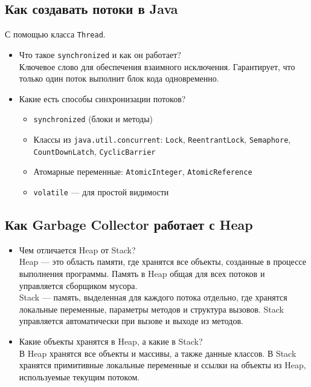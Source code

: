 \documentclass[a4paper,14pt]{article}
\begin{document}
\subsection{Как создавать потоки в Java}
С помощью класса \texttt{Thread}.
\begin{itemize}
\item Что такое \texttt{synchronized} и как он работает? \\
Ключевое слово для обеспечения взаимного исключения. Гарантирует, что только один поток выполнит блок кода одновременно.

\item Какие есть способы синхронизации потоков? \\
\begin{itemize}
\item \texttt{synchronized} (блоки и методы)
\item Классы из \texttt{java.util.concurrent}: \texttt{Lock}, \texttt{ReentrantLock}, \texttt{Semaphore}, \texttt{CountDownLatch}, \texttt{CyclicBarrier}
\item Атомарные переменные: \texttt{AtomicInteger}, \texttt{AtomicReference}
\item \texttt{volatile} — для простой видимости
\end{itemize}
\end{itemize}
\subsection{Как Garbage Collector работает с Heap}

\begin{itemize}
\item Чем отличается Heap от Stack? \\
Heap — это область памяти, где хранятся все объекты, созданные в процессе выполнения программы. Память в Heap общая для всех потоков и управляется сборщиком мусора. \\
Stack — память, выделенная для каждого потока отдельно, где хранятся локальные переменные, параметры методов и структура вызовов. Stack управляется автоматически при вызове и выходе из методов.

\item Какие объекты хранятся в Heap, а какие в Stack? \\
В Heap хранятся все объекты и массивы, а также данные классов. В Stack хранятся примитивные локальные переменные и ссылки на объекты из Heap, используемые текущим потоком.
\end{itemize}
\end{document}
